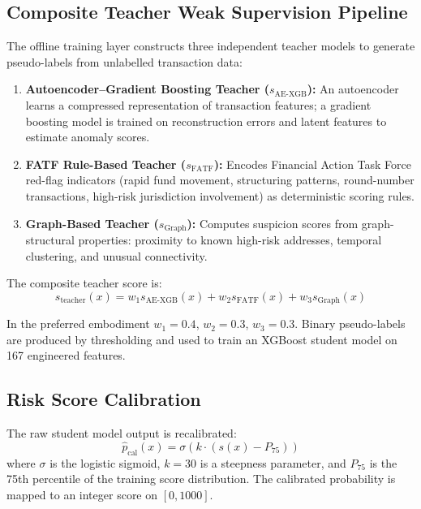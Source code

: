 \documentclass[12pt,a4paper]{article}
\begin{document}
\subsection{Composite Teacher Weak Supervision Pipeline}

The offline training layer constructs three independent teacher models to
generate pseudo-labels from unlabelled transaction data:

\begin{enumerate}[label=(\alph*)]
\item \textbf{Autoencoder--Gradient Boosting Teacher ($s_{\text{AE-XGB}}$):}
An autoencoder learns a compressed representation of transaction features;
a gradient boosting model is trained on reconstruction errors and latent
features to estimate anomaly scores.

\item \textbf{FATF Rule-Based Teacher ($s_{\text{FATF}}$):} Encodes
Financial Action Task Force red-flag indicators (rapid fund movement,
structuring patterns, round-number transactions, high-risk jurisdiction
involvement) as deterministic scoring rules.

\item \textbf{Graph-Based Teacher ($s_{\text{Graph}}$):} Computes
suspicion scores from graph-structural properties: proximity to known
high-risk addresses, temporal clustering, and unusual connectivity.
\end{enumerate}

The composite teacher score is:
\begin{equation}
s_{\text{teacher}}(x) = w_1 s_{\text{AE-XGB}}(x) +
w_2 s_{\text{FATF}}(x) + w_3 s_{\text{Graph}}(x)
\end{equation}

In the preferred embodiment $w_1{=}0.4$, $w_2{=}0.3$, $w_3{=}0.3$.
Binary pseudo-labels are produced by thresholding and used to train an
XGBoost student model on 167 engineered features.

\subsection{Risk Score Calibration}

The raw student model output is recalibrated:
\begin{equation}
\hat{p}_{\text{cal}}(x) = \sigma\!\left(k\cdot(s(x)-P_{75})\right)
\end{equation}
where $\sigma$ is the logistic sigmoid, $k{=}30$ is a steepness parameter,
and $P_{75}$ is the 75th percentile of the training score distribution. The
calibrated probability is mapped to an integer score on $[0,1000]$.
\end{document}
